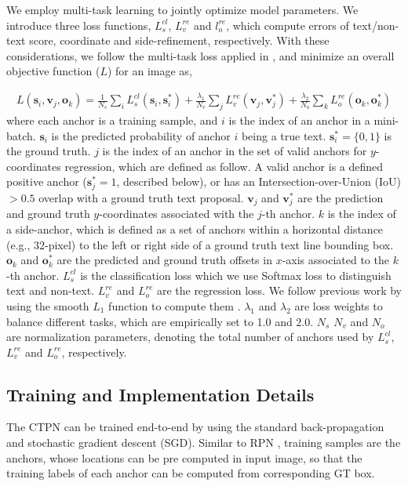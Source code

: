 \documentclass[runningheads]{llncs}
\begin{document}
We employ multi-task learning to jointly optimize model parameters. We introduce three loss functions, $L^{cl}_s$, $L^{re}_v$ and $l^{re}_o$, which compute errors of text/non-text score, coordinate and side-refinement, respectively.  With these considerations, we follow the multi-task loss applied in  \cite{Girshick2015,Ren2015}, and minimize an overall objective function ($L$) for an image as,

\begin{eqnarray}
L(\textbf{s}_i, \textbf{v}_j, \textbf{o}_k) =\frac1{N_{s}}\sum_iL^{cl}_{s}(\textbf{s}_i, \textbf{s}_i^*)
+\frac{\lambda_1}{N_v}\sum_j L^{re}_v(\textbf{v}_j, \textbf{v}_j^*)
+\frac{\lambda_2}{N_o}\sum_k L^{re}_o(\textbf{o}_k, \textbf{o}_k^*)
\end{eqnarray}
where each anchor is a training sample, and $i$ is the index of an anchor in a mini-batch. $\textbf{s}_i$ is the predicted probability of anchor $i$ being a true text. 
$\textbf{s}_i^*=\{0,1\}$ is the ground truth. 
$j$ is the index of an anchor in the set of valid anchors for $y$-coordinates regression, which are defined as follow.
A valid anchor is a defined positive anchor ($\textbf{s}_j^*=1$, described below), or has an Intersection-over-Union (IoU) $>0.5$ overlap  with a ground truth text proposal.
$\textbf{v}_j$ and $\textbf{v}_j^*$ are the prediction and ground truth $y$-coordinates associated with the $j$-{th} anchor.
$k$ is the index of a side-anchor, which is defined as a set of anchors within a horizontal distance (e.g.,  32-pixel) to the left or right side of a ground truth text line bounding box.
$\textbf{o}_k$ and $\textbf{o}_k^*$ are the predicted and ground truth offsets in $x$-axis associated to the $k$-{th} anchor.
$L^{cl}_s$ is the classification loss which we use Softmax loss to distinguish text and non-text. $L^{re}_v$ and $L^{re}_o$ are the regression loss. 
We follow previous work by using the smooth $L_1$ function to compute them \cite{Girshick2015,Ren2015}.
$\lambda_1$ and $\lambda_2$ are loss weights to balance different tasks, which are empirically set to 1.0 and 2.0.  $N_{s}$ $N_{v}$ and $N_{o}$ are normalization parameters, denoting the total number of anchors used by $L^{cl}_s$, $L^{re}_v$ and $L^{re}_o$, respectively.


\subsection{Training and Implementation Details}
The CTPN can be trained end-to-end by using the standard back-propagation and stochastic gradient descent (SGD). Similar to RPN \cite{Ren2015}, training samples are the anchors, whose locations can be pre computed in input image, so that the training labels of each anchor can be computed from corresponding GT box.
\end{document}
